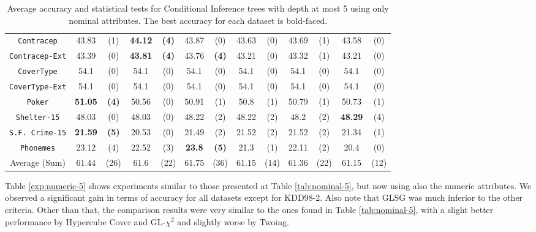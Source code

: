 \begin{table}
\begin{tabular}{c|cc|cc|cc|cc|cc|cc}
{\tt Contracep}    &43.83       & (1)       & {\bf 44.12} & {\bf (4)} & 43.87       & (0)       & 43.63       & (0)       & 43.69       & (1)         & 43.58       & (0)         \\
{\tt Contracep-Ext}&43.39       & (0)       & {\bf 43.81} & {\bf (4)} & 43.76       & {\bf (4)} & 43.21       & (0)       & 43.32       & (1)         & 43.21       & (0)         \\
{\tt CoverType}    &54.1        & (0)       & 54.1        & (0)       & 54.1        & (0)       & 54.1        & (0)       & 54.1        & (0)         & 54.1        & (0)         \\
{\tt CoverType-Ext}&54.1        & (0)       & 54.1        & (0)       & 54.1        & (0)       & 54.1        & (0)       & 54.1        & (0)         & 54.1        & (0)         \\
{\tt Poker}        &{\bf 51.05} & {\bf (4)} & 50.56       & (0)       & 50.91       & (1)       & 50.8        & (1)       & 50.79       & (1)         & 50.73       & (1)         \\  
{\tt Shelter-15}   & 48.03      & (0)       & 48.03       & (0)       & 48.22       & (2)       & 48.22       & (2)       & 48.2        & (2)         & {\bf 48.29} & (4)         \\   
{\tt S.F. Crime-15}&{\bf 21.59} & {\bf (5)} & 20.53       & (0)       & 21.49       & (2)       & 21.52       & (2)       & 21.52       & (2)         & 21.34       & (1)         \\ 
{\tt Phonemes}     & 23.12      & (4)       & 22.52       & (3)       & {\bf 23.8 } & {\bf (5)} & 21.3        & (1)       & 22.11       & (2)         & 20.4        & (0)         \\ 
\hline
Average (Sum)      & 61.44      & (26)      & 61.6        & (22)      & 61.75       & (36)      & 61.15       & (14)      & 61.36       & (22)        & 61.15       & (12)
       \end{tabular}
    \caption{Average accuracy and statistical tests  for  Conditional Inference trees with depth at most 5 using only nominal attributes. The best accuracy for each dataset is bold-faced.}
\label{tab:ctree-5}
\end{table}


Table \ref{exp:numeric-5} shows experiments  similar to those presented at Table \ref{tab:nominal-5}, but now using also the numeric attributes. We observed a significant gain in terms of accuracy for all datasets except for KDD98-2. Also note that GLSG was much inferior to the other criteria. Other than that, the comparison results were very similar to the ones found in Table \ref{tab:nominal-5}, with a slight better performance by Hypercube Cover and GL-$\chi^2$ and slightly worse by Twoing.

